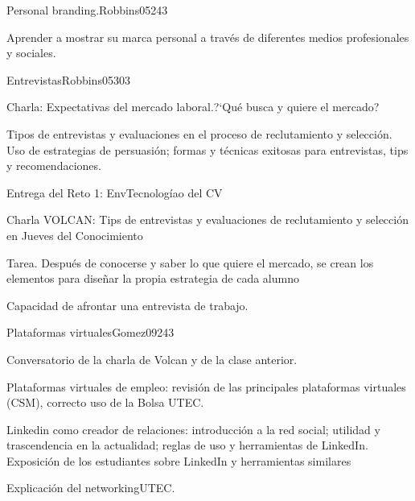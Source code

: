 \begin{syllabus}
\begin{unit}{Personal branding.}{}{Robbins05}{24}{3}
   \begin{learningoutcomes}
      \item Aprender a mostrar su marca personal a través de diferentes medios profesionales y sociales.
   \end{learningoutcomes}
\end{unit}

\begin{unit}{Entrevistas}{}{Robbins05}{30}{3}
   \begin{topics}
      \item Charla: Expectativas del mercado laboral.?`Qué busca y quiere el mercado?
      \item Tipos de entrevistas y evaluaciones en el proceso de reclutamiento y selección. Uso de estrategias de persuasión; formas y técnicas exitosas para entrevistas, tips y recomendaciones.
      \item Entrega del Reto 1: EnvTecnologíao del CV
      \item Charla VOLCAN: Tips de entrevistas y evaluaciones de reclutamiento y selección en Jueves del Conocimiento
      \item Tarea. Después de conocerse y saber lo que quiere el mercado, se crean los elementos para diseñar la propia estrategia de cada alumno
   \end{topics}

   \begin{learningoutcomes}
      \item Capacidad de afrontar una entrevista de trabajo.
   \end{learningoutcomes}
\end{unit}

\begin{unit}{Plataformas virtuales}{}{Gomez09}{24}{3}
   \begin{topics}
      \item Conversatorio de la charla de Volcan y de la clase anterior.
      \item Plataformas virtuales de empleo: revisión de las principales plataformas virtuales (CSM), correcto uso de la Bolsa UTEC.
      \item Linkedin como creador de relaciones: introducción a la red social; utilidad y trascendencia en la actualidad; reglas de uso y herramientas de LinkedIn. Exposición de los estudiantes sobre LinkedIn y herramientas similares
      \item Explicación del networkingUTEC.   
   \end{topics}


\end{unit}
\end{syllabus}
